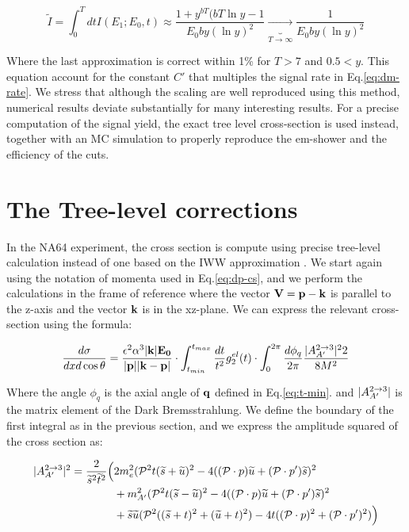 \begin{equation}
  \label{eq:i-int}
  \widetilde{I} = \int^T_0 dt I(E_1; E_0, t) \approx \frac{1 + y^{bT}(bT\ln{y} - 1}{E_0by(\ln{y})^2} \underbrace{\to}_{T \to \infty} \frac{1}{E_0by(\ln{y})^2}
\end{equation}

Where the last approximation is correct within 1\% for $T>7$ and $0.5 < y$. This equation account for the constant $C'$ that multiples the signal rate in Eq.\ref{eq:dm-rate}. We stress that although the scaling are well reproduced using this method, numerical results deviate substantially for many interesting results. For a precise computation of the signal yield, the exact tree level cross-section is used instead, together with an MC simulation to properly reproduce the em-shower and the efficiency of the cuts.



\section{The Tree-level corrections}
\label{appA:sec:cross-section-tl}

In the NA64 experiment, the cross section is compute using precise tree-level calculation instead of one based on the IWW approximation \cite{DMsimulation}. We start again using the notation of momenta used in Eq.\ref{eq:dp-cs}, and we perform the calculations in the frame of reference where the vector $\bf{V} = \bf{p} - \bf{k}$ is parallel to the z-axis and the vector $\bf{k}$ is in the xz-plane. We can express the relevant cross-section using the formula:

\begin{equation}
  \label{eq:cs-tl}
  \frac{d\sigma}{dx d\cos{\theta}} = \frac{\epsilon^2 \alpha^3 |\bf{k}| E_0}{|\bf{p}| |\bf{k} - \bf{p}|} \cdot \int_{t_{min}}^{t_{max}} \frac{dt}{t^2} g^{el}_{2}(t) \cdot \int_0^{2\pi} \frac{d\phi_q}{2\pi} \frac{|A^{2 \to 3}_{A'}|^22}{8 M^2}
\end{equation}

Where the angle $\phi_q$ is the axial angle of $\bf{q}$ defined in Eq.\ref{eq:t-min}. and $|A^{2 \to 3}_{A'}|$ is the matrix element of the Dark Bremsstrahlung. We define the boundary of the first integral as in the previous section, and we express the amplitude squared of the cross section as:

\begin{equation}
  \label{eq:cs-dp-amp}
  \begin{aligned}
    |A^{2 \to 3}_{A'}|^2 = \frac{2}{\widetilde{s}^2\widetilde{t}^2} \Big( &2m^2_e (\mathcal{P}^2 t (\widetilde{s} + \widetilde{u})^2 - 4((\mathcal{P} \cdot p)\widetilde{u} + (\mathcal{P} \cdot p')\widetilde{s})^2  \\
      &+ m^2_{A'}(\mathcal{P}^2 t (\widetilde{s} - \widetilde{u})^2 -4((\mathcal{P}\cdot p)\widetilde{u} + (\mathcal{P}\cdot p')\widetilde{s})^2 \\
      &+ \widetilde{s}\widetilde{u}(\mathcal{P}^2 ((\widetilde{s} + t)^2 + (\widetilde{u}+t)^2) - 4 t ((\mathcal{P} \cdot p)^2 + (\mathcal{P} \cdot p')^2) \Big)
  \end{aligned}    
\end{equation}

